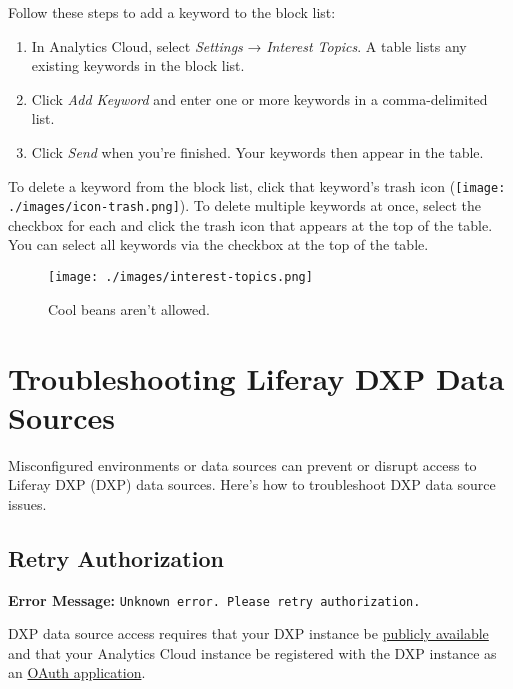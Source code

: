 Follow these steps to add a keyword to the block list:

\begin{enumerate}
\def\labelenumi{\arabic{enumi}.}
\item
  In Analytics Cloud, select \emph{Settings} → \emph{Interest Topics}. A
  table lists any existing keywords in the block list.
\item
  Click \emph{Add Keyword} and enter one or more keywords in a
  comma-delimited list.
\item
  Click \emph{Send} when you're finished. Your keywords then appear in
  the table.
\end{enumerate}

To delete a keyword from the block list, click that keyword's trash icon
(\texttt{[image: ./images/icon-trash.png]}). To delete multiple keywords
at once, select the checkbox for each and click the trash icon that
appears at the top of the table. You can select all keywords via the
checkbox at the top of the table.

\begin{figure}
\centering
\texttt{[image: ./images/interest-topics.png]}
\caption{Cool beans aren't allowed.}
\end{figure}

\chapter{Troubleshooting Liferay DXP Data
Sources}\label{troubleshooting-liferay-dxp-data-sources}

Misconfigured environments or data sources can prevent or disrupt access
to Liferay DXP (DXP) data sources. Here's how to troubleshoot DXP data
source issues.

\section{Retry Authorization}\label{retry-authorization}

\textbf{Error Message:}
\texttt{Unknown\ error.\ Please\ retry\ authorization.}

DXP data source access requires that your DXP instance be
\href{https://github.com/liferay/liferay-docs/blob/7.1.x/discover/analytics-cloud/articles/02-getting-started/02-adding-a-liferay-dxp-data-source.markdown\#step-2-make-sure-liferay-dxp-and-its-json-web-services-are-accessible}{publicly
available} and that your Analytics Cloud instance be registered with the
DXP instance as an
\href{https://github.com/liferay/liferay-docs/blob/7.1.x/discover/analytics-cloud/articles/02-getting-started/02-adding-a-liferay-dxp-data-source.markdown\#step-2-register-analytics-cloud-with-your-liferay-dxp-instance}{OAuth
application}.

